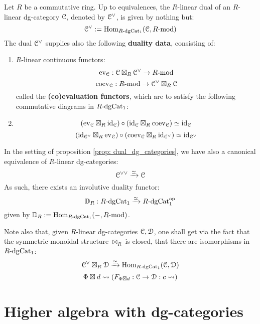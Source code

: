             \begin{proposition} \label{prop: dual_dg_categories}
                Let $R$ be a commutative ring. Up to equivalences, the $R$-linear dual of an $R$-linear dg-category $\mathcal{C}$, denoted by $\mathcal{C}^{\vee}$, is given by nothing but:
                    $$\mathcal{C}^{\vee} := \mathrm{Hom}_{R\text{-}\mathrm{dg}\mathrm{Cat}_1}(\mathcal{C}, R\text{-}\mathrm{mod})$$
                The dual $\mathcal{C}^{\vee}$ supplies also the following \textbf{duality data}, consisting of:
                \begin{enumerate}
                    \item $R$-linear continuous functors:
                        $$\mathrm{ev}_{\mathcal{C}}: \mathcal{C} \boxtimes_R \mathcal{C}^{\vee} \to R\text{-}\mathrm{mod}$$
                        $$\mathrm{co}\mathrm{ev}_{\mathcal{C}}: R\text{-}\mathrm{mod} \to \mathcal{C}^{\vee} \boxtimes_R \mathcal{C}$$
                    called the \textbf{(co)evaluation functors}, which are to satisfy the following commutative diagrams in $R\text{-}\mathrm{dg}\mathrm{Cat}_1$:
                    \item
                        $$( \mathrm{ev}_{\mathcal{C}} \boxtimes_R \mathrm{id}_{\mathcal{C}} ) \circ ( \mathrm{id}_{\mathcal{C}} \boxtimes_R \mathrm{co}\mathrm{ev}_{\mathcal{C}} ) \simeq \mathrm{id}_{\mathcal{C}}$$
                        $$( \mathrm{id}_{\mathcal{C}^{\vee}} \boxtimes_R \mathrm{ev}_{\mathcal{C}} ) \circ ( \mathrm{co}\mathrm{ev}_{\mathcal{C}} \boxtimes_R \mathrm{id}_{\mathcal{C}^{\vee}} ) \simeq \mathrm{id}_{\mathcal{C}^{\vee}}$$
                \end{enumerate}
            \end{proposition}
            \begin{corollary}
                In the setting of proposition \ref{prop: dual_dg_categories}, we have also a canonical equivalence of $R$-linear dg-categories:
                    $$\mathcal{C}^{\vee \vee} \xrightarrow[]{\simeq} \mathcal{C}$$
                As such, there exists an involutive duality functor:
                    $$\mathbb{D}_R: R\text{-}\mathrm{dg}\mathrm{Cat}_1 \xrightarrow[]{\simeq} R\text{-}\mathrm{dg}\mathrm{Cat}_1^{\mathrm{op}}$$
                given by $\mathbb{D}_R := \mathrm{Hom}_{R\text{-}\mathrm{dg}\mathrm{Cat}_1}(-, R\text{-}\mathrm{mod})$.
            \end{corollary}
            Note also that, given $R$-linear dg-categories $\mathcal{C}, \mathcal{D}$, one shall get via the fact that the symmetric monoidal structure $\boxtimes_R$ is closed, that there are isomorphisms in $R\text{-}\mathrm{dg}\mathrm{Cat}_1$:
                $$\mathcal{C}^{\vee} \boxtimes_R \mathcal{D} \xrightarrow[]{\simeq} \mathrm{Hom}_{R\text{-}\mathrm{dg}\mathrm{Cat}_1}(\mathcal{C}, \mathcal{D})$$
                $$\Phi \boxtimes d \leadsto \left( F_{\Phi \boxtimes d}: \mathcal{C} \to \mathcal{D}: c \leadsto  \right)$$

    \section{Higher algebra with dg-categories}
